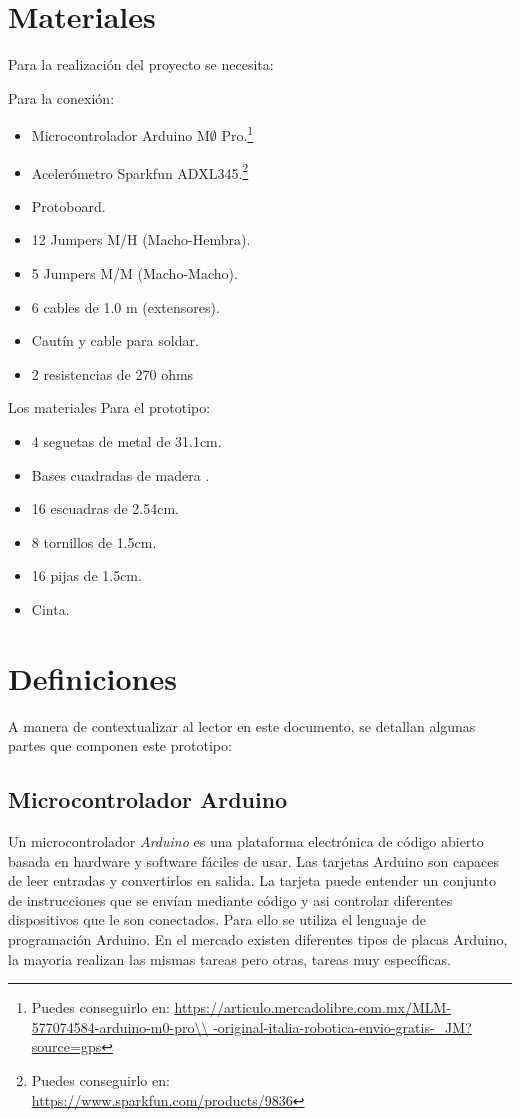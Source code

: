 \documentclass[10pt, a4paper, twocolumn]{article} %
\begin{document}
\section{Materiales}

Para la realización del proyecto se necesita:

Para la conexión:
\begin{itemize}
\item Microcontrolador Arduino M$\emptyset$ Pro.\footnote{Puedes conseguirlo en: \url{https://articulo.mercadolibre.com.mx/MLM-577074584-arduino-m0-pro\\
-original-italia-robotica-envio-gratis-_JM?source=gps}}
\item Acelerómetro Sparkfun ADXL345.\footnote{Puedes conseguirlo en:\\ \url{https://www.sparkfun.com/products/9836}}
\item Protoboard.
\item 12 Jumpers M/H (Macho-Hembra).
\item 5 Jumpers M/M (Macho-Macho).
\item 6 cables de 1.0 m (extensores).
\item Cautín y cable para soldar.
\item 2 resistencias de 270 ohms
\end{itemize}
Los materiales 
Para el prototipo:
\begin{itemize}
\item 4 seguetas de metal de 31.1cm.
\item Bases cuadradas de madera .
\item 16 escuadras de 2.54cm.
\item 8 tornillos de 1.5cm.
\item 16 pijas de 1.5cm.
\item Cinta.
\end{itemize}


\section{Definiciones}

A manera de contextualizar al lector en este documento, se detallan algunas partes que componen este prototipo:

\subsection{Microcontrolador Arduino}

Un microcontrolador \textit{Arduino} es una plataforma electrónica de código abierto basada en hardware y software fáciles de usar. Las tarjetas Arduino son capaces de leer entradas y convertirlos en salida. La tarjeta puede entender un conjunto de instrucciones que se envían mediante código y asi controlar diferentes dispositivos que le son conectados. Para ello se utiliza el lenguaje de programación Arduino. En el mercado existen diferentes tipos de placas Arduino, la mayoria realizan las mismas tareas pero otras, tareas muy específicas.
\end{document}
